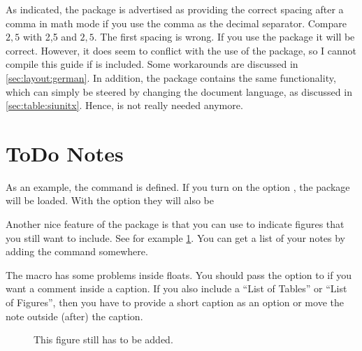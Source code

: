 As indicated, the  package is advertised as providing
the correct spacing after a comma in math mode if you use the comma as
the decimal separator. Compare \(2,5\) with 2,5 and \(2{,}5\). The first
spacing is wrong. If you use the  package it will be
correct. However, it does seem to conflict with the use of the
 package, so I cannot compile this guide
if  is included. Some  workarounds are discussed in
\cref{sec:layout:german}. In addition, the 
package contains the same functionality, which can simply be steered
by changing the document language, as discussed in
\cref{sec:table:siunitx}.
Hence,  is not really needed anymore.

\section{ToDo Notes}%
\label{sec:package:todo}

As an example, the  command is defined.
If you turn on the option , the package will be loaded.
With the option  they will also be 

Another nice feature of the  package is that you can use
to indicate figures that you still want to include.
See for example \cref{fig:missing}. You can get a list of your notes
by adding the  command somewhere.

The macro  has some problems inside floats.
You should pass the option  to  if you
want a comment inside a caption. If you also include a \enquote{List of Tables}
or \enquote{List of Figures}, then you have to provide a short caption
as an option or move the note outside (after) the caption.

\begin{figure}[htbp]
  \caption[Optional caption without  so that \enquote{List of Figures} does not break.]{%
    This figure still has to be added.
  }%
  \label{fig:missing}
\end{figure}


